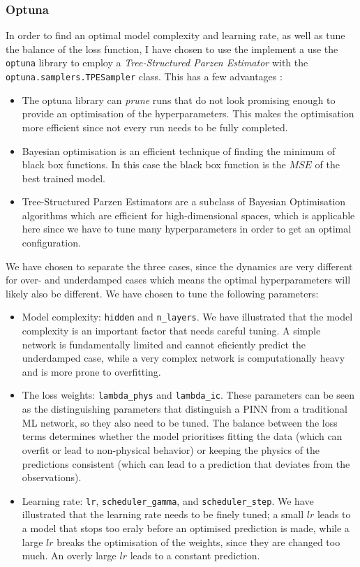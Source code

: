\documentclass[we,twoside,openright,a4paper,11pt]{uantwerpenbamathesis}
\begin{document}
\subsubsection{Optuna}\label{ch:optuna_DHO}
In order to find an optimal model complexity and learning rate, as well as tune the balance of the loss function, I have chosen to use the implement a use the \verb|optuna| library to employ a \textit{Tree-Structured Parzen Estimator} with the \verb|optuna.samplers.TPESampler| class. This has a few advantages \cite{watanabe2025treestructuredparzenestimatorunderstanding}:
\begin{itemize}
    \item The optuna library can \textit{prune} runs that do not look promising enough to provide an optimisation of the hyperparameters. This makes the optimisation more efficient since not every run needs to be fully completed.
    \item Bayesian optimisation is an efficient technique of finding the minimum of black box functions. In this case the black box function is the $MSE$ of the best trained model.
    \item Tree-Structured Parzen Estimators are a subclass of Bayesian Optimisation algorithms which are efficient for high-dimensional spaces, which is applicable here since we have to tune many hyperparameters in order to get an optimal configuration.
\end{itemize}
We have chosen to separate the three cases, since the dynamics are very different for over- and underdamped cases which means the optimal hyperparameters will likely also be different. We have chosen to tune the following parameters:
\begin{itemize}
    \item Model complexity: \texttt{hidden} and \texttt{n\_layers}. We have illustrated that the model complexity is an important factor that needs careful tuning. A simple network is fundamentally limited and cannot eficiently predict the underdamped case, while a very complex network is computationally heavy and is more prone to overfitting.
    \item The loss weights: \texttt{lambda\_phys} and \texttt{lambda\_ic}. These parameters can be seen as the distinguishing parameters that distinguish a PINN from a traditional ML network, so they also need to be tuned. The balance between the loss terms determines whether the model prioritises fitting the data (which can overfit or lead to non-physical behavior) or keeping the physics of the predictions consistent (which can lead to a prediction that deviates from the observations).
    \item Learning rate: \texttt{lr}, \texttt{scheduler\_gamma}, and \texttt{scheduler\_step}. We have illustrated that the learning rate needs to be finely tuned; a small $lr$ leads to a model that stops too eraly before an optimised prediction is made, while a large $lr$ breaks the optimisation of the weights, since they are changed too much. An overly large $lr$ leads to a constant prediction.
\end{itemize}
\end{document}
